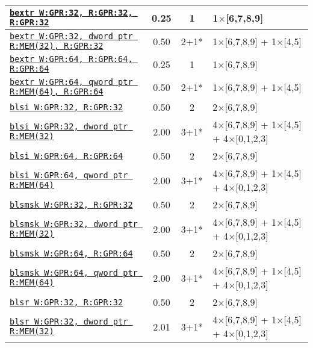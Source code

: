 \documentclass[a4paper,english,fontsize=9]{scrartcl}
\begin{document}
\begin{longtable}{p{}ccL{.25\textwidth}}
  \midrule
  \texttt{\href{https://felixcloutier.com/x86/BEXTR.html}{bextr W:GPR:32, R:GPR:32, R:GPR:32}} & 0.25 & 1 & 1\(\times\)[6,7,8,9] \\
  \midrule
  \texttt{\href{https://felixcloutier.com/x86/BEXTR.html}{bextr W:GPR:32, dword ptr R:MEM(32), R:GPR:32}} & 0.50 & 2+1* & 1\(\times\)[6,7,8,9] + 1\(\times\)[4,5] \\
  \midrule
  \texttt{\href{https://felixcloutier.com/x86/BEXTR.html}{bextr W:GPR:64, R:GPR:64, R:GPR:64}} & 0.25 & 1 & 1\(\times\)[6,7,8,9] \\
  \midrule
  \texttt{\href{https://felixcloutier.com/x86/BEXTR.html}{bextr W:GPR:64, qword ptr R:MEM(64), R:GPR:64}} & 0.50 & 2+1* & 1\(\times\)[6,7,8,9] + 1\(\times\)[4,5] \\
  \midrule
  \texttt{\href{https://felixcloutier.com/x86/BLSI.html}{blsi W:GPR:32, R:GPR:32}} & 0.50 & 2 & 2\(\times\)[6,7,8,9] \\
  \midrule
  \texttt{\href{https://felixcloutier.com/x86/BLSI.html}{blsi W:GPR:32, dword ptr R:MEM(32)}} & 2.00 & 3+1* & 4\(\times\)[6,7,8,9] + 1\(\times\)[4,5] + 4\(\times\)[0,1,2,3] \\
  \midrule
  \texttt{\href{https://felixcloutier.com/x86/BLSI.html}{blsi W:GPR:64, R:GPR:64}} & 0.50 & 2 & 2\(\times\)[6,7,8,9] \\
  \midrule
  \texttt{\href{https://felixcloutier.com/x86/BLSI.html}{blsi W:GPR:64, qword ptr R:MEM(64)}} & 2.00 & 3+1* & 4\(\times\)[6,7,8,9] + 1\(\times\)[4,5] + 4\(\times\)[0,1,2,3] \\
  \midrule
  \texttt{\href{https://felixcloutier.com/x86/BLSMSK.html}{blsmsk W:GPR:32, R:GPR:32}} & 0.50 & 2 & 2\(\times\)[6,7,8,9] \\
  \midrule
  \texttt{\href{https://felixcloutier.com/x86/BLSMSK.html}{blsmsk W:GPR:32, dword ptr R:MEM(32)}} & 2.00 & 3+1* & 4\(\times\)[6,7,8,9] + 1\(\times\)[4,5] + 4\(\times\)[0,1,2,3] \\
  \midrule
  \texttt{\href{https://felixcloutier.com/x86/BLSMSK.html}{blsmsk W:GPR:64, R:GPR:64}} & 0.50 & 2 & 2\(\times\)[6,7,8,9] \\
  \midrule
  \texttt{\href{https://felixcloutier.com/x86/BLSMSK.html}{blsmsk W:GPR:64, qword ptr R:MEM(64)}} & 2.00 & 3+1* & 4\(\times\)[6,7,8,9] + 1\(\times\)[4,5] + 4\(\times\)[0,1,2,3] \\
  \midrule
  \texttt{\href{https://felixcloutier.com/x86/BLSR.html}{blsr W:GPR:32, R:GPR:32}} & 0.50 & 2 & 2\(\times\)[6,7,8,9] \\
  \midrule
  \texttt{\href{https://felixcloutier.com/x86/BLSR.html}{blsr W:GPR:32, dword ptr R:MEM(32)}} & 2.01 & 3+1* & 4\(\times\)[6,7,8,9] + 1\(\times\)[4,5] + 4\(\times\)[0,1,2,3] \\

\end{longtable}
\end{document}
